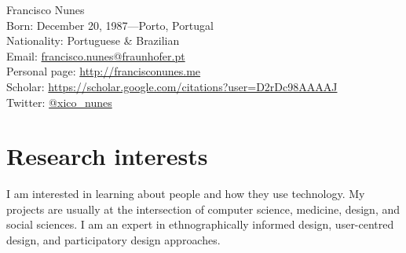 \documentclass[11pt, a4paper]{article} %
\begin{document}

{\LARGE Francisco Nunes}\\[1cm] %
Born: December 20, 1987---Porto, Portugal\\ %
Nationality: Portuguese \& Brazilian \\%

Email: \href{mailto:francisco.nunes@fraunhofer.pt}{francisco.nunes@fraunhofer.pt}\\ %
Personal page: \href{http://francisconunes.me}{http://francisconunes.me}\\
Scholar: \href{https://scholar.google.com/citations?user=D2rDc98AAAAJ}{https://scholar.google.com/citations?user=D2rDc98AAAAJ}\\
Twitter: \href{https://twitter.com/xico_nunes}{@xico\_nunes}









\section*{Research interests}

I am interested in learning about people and how they use technology. My projects are usually at the intersection of computer science, medicine, design, and social sciences. I am an expert in ethnographically informed design, user-centred design, and participatory design approaches.\\
\end{document}
